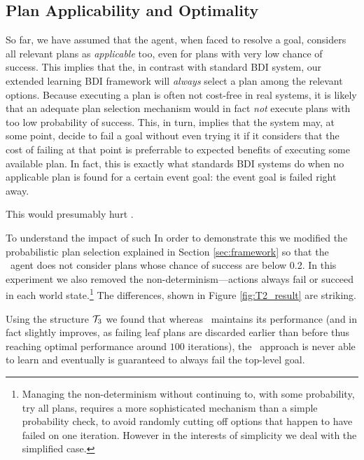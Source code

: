 \subsection{Plan Applicability and Optimality}

So far, we have assumed that the agent, when faced to resolve a goal, considers
all relevant plans as \emph{applicable} too, even for plans with very low chance
of success.
This implies that the, in contrast with standard BDI system, our extended
learning BDI framework will \emph{always} select a plan among the relevant
options.
Because executing a plan is often not cost-free in real systems, it is likely
that an adequate plan selection mechanism would in fact \emph{not} execute plans
with too low probability of success. This, in turn, implies that the system
may, at some point, decide to fail a goal without even trying it if it
considers that the cost of failing at that point is preferrable to expected
benefits of executing some available plan.
In fact, this is exactly what standards BDI systems do when no applicable plan
is found for a certain event goal: the event goal is failed right away.



This would presumably hurt \CL.

To understand the impact of such
In order to demonstrate this we modified the probabilistic plan
selection explained in Section \ref{sec:framework} so that the \JACK\
agent does not consider plans whose chance of success are below 0.2.
In this experiment we also removed the non-determinism---actions
always fail or succeed in each world state.\footnote{Managing the
non-determinism without continuing to, with some probability, try all
plans, requires a more sophisticated mechanism than a simple
probability check, to avoid randomly cutting off options that happen
to have failed on one iteration. However in the interests of
simplicity we deal with the simplified case.}
%
The differences, shown in Figure \ref{fig:T2_result} are striking.

Using the structure 
${\mathcal{T}}_3$ we  found that whereas \BUL\ maintains its performance (and in
fact slightly improves, as failing leaf plans are discarded earlier
than before thus reaching optimal performance around $100$
iterations), the \CL\ approach is never able to learn and eventually
is guaranteed to always fail the top-level goal.

